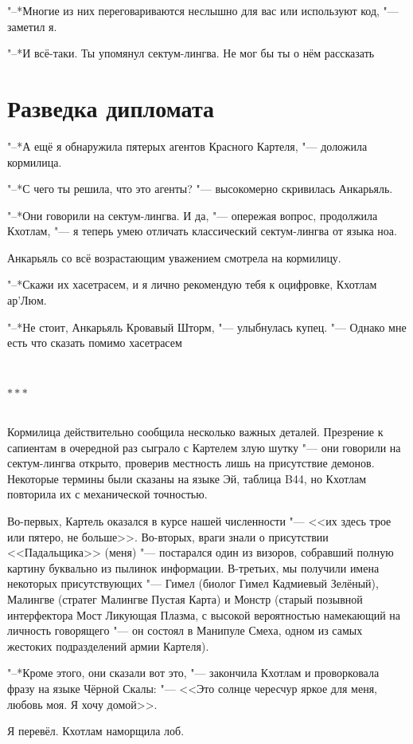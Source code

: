 \documentclass[a4paper,10pt,fleqn]{book}
\newcommand{\ldotst}{\so{...}\xspace}
\newcommand{\ldotsq}{\so{?\hbox{\hspace{-.212em}}..}\xspace}
\newcommand{\razd}{~\\{\centering\Large\bfseries$\ast \ast \ast$\par}~\\}
\begin{document}
"--*Многие из них переговариваются неслышно для вас или используют код, "--- заметил я.

"--*И всё-таки.
Ты упомянул сектум-лингва.
Не мог бы ты о нём рассказать\ldotsq

\section{Разведка дипломата}

"--*А ещё я обнаружила пятерых агентов Красного Картеля, "--- доложила кормилица.

"--*С чего ты решила, что это агенты? "--- высокомерно скривилась Анкарьяль.

"--*Они говорили на сектум-лингва.
И да, "--- опережая вопрос, продолжила Кхотлам, "--- я теперь умею отличать классический сектум-лингва от языка ноа.

Анкарьяль со всё возрастающим уважением смотрела на кормилицу.

"--*Скажи их хасетрасем, и я лично рекомендую тебя к оцифровке, Кхотлам ар'Люм.

"--*Не стоит, Анкарьяль Кровавый Шторм, "--- улыбнулась купец.
"--- Однако мне есть что сказать помимо хасетрасем\ldotst

\razd

Кормилица действительно сообщила несколько важных деталей.
Презрение к сапиентам в очередной раз сыграло с Картелем злую шутку "--- они говорили на сектум-лингва открыто, проверив местность лишь на присутствие демонов.
Некоторые термины были сказаны на языке Эй, таблица B44, но Кхотлам повторила их с механической точностью.

Во-первых, Картель оказался в курсе нашей численности "--- <<их здесь трое или пятеро, не больше>>.
Во-вторых, враги знали о присутствии <<Падальщика>> (меня) "--- постарался один из визоров, собравший полную картину буквально из пылинок информации.
В-третьих, мы получили имена некоторых присутствующих "--- Гимел (биолог Гимел Кадмиевый Зелёный), Малингве (стратег Малингве Пустая Карта) и Монстр (старый позывной интерфектора Мост Ликующая Плазма, с высокой вероятностью намекающий на личность говорящего "--- он состоял в Манипуле Смеха, одном из самых жестоких подразделений армии Картеля).

"--*Кроме этого, они сказали вот это, "--- закончила Кхотлам и проворковала фразу на языке Чёрной Скалы:
"--- <<Это солнце чересчур яркое для меня, любовь моя.
Я хочу домой>>.

Я перевёл.
Кхотлам наморщила лоб.
\end{document}
